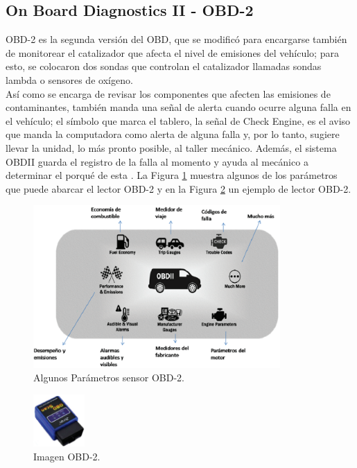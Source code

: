 \documentclass[a4paper,10pt, oneside, titlepage]{article}
\begin{document}
	\subsection{On Board Diagnostics II - OBD-2}\label{Etiqueta_Seccion_OBD2}
	OBD-2 es la segunda versión del OBD, que se modificó para encargarse también de monitorear el catalizador que afecta el nivel de emisiones del vehículo; para esto, se colocaron dos sondas que controlan el catalizador llamadas sondas
	lambda o sensores de oxígeno. \\\newline
	\indent Así como se encarga de revisar los componentes que afecten las emisiones de contaminantes, también manda una señal de alerta cuando ocurre alguna falla en el vehículo; el símbolo que marca el tablero, la señal de Check Engine, es el aviso que manda la computadora como alerta de alguna falla y, por lo tanto, sugiere llevar la unidad, lo más pronto posible, al taller mecánico. Además, el sistema OBDII guarda el registro de la falla al momento y ayuda al mecánico a determinar el porqué de esta \cite{CONUEE}. La Figura \ref{Parametros_OBD-2} muestra algunos de los parámetros que puede abarcar el lector OBD-2 y en la Figura \ref{Imagen_OBD-2} un ejemplo de lector OBD-2.
	\begin{figure}[!h]
		\centering
		\includegraphics[width = 1\linewidth, height = 6.2cm]{Parametros_OBD-2.png}
		\caption{Algunos Parámetros sensor OBD-2.}
		\label{Parametros_OBD-2}
	\end{figure}
	\begin{figure}[!h]
		\centering
		\includegraphics[width = 0.2\linewidth, height = 2cm]{Imagen_OBD-2.png}
		\caption{Imagen OBD-2.}
		\label{Imagen_OBD-2}
	\end{figure}
	
\end{document}
